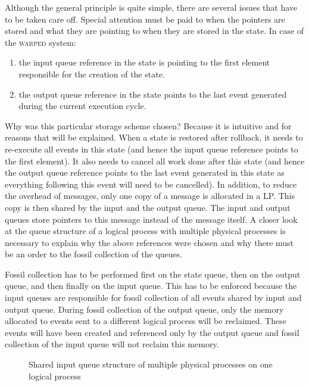 \documentclass[11pt]{report}
\begin{document}
Although the general principle is quite simple, there are several issues
that have to be taken care off. Special attention must be paid to when the
pointers are stored and what they are pointing to when they are stored in
the state. In case of the \textsc{warped} system:

\begin{enumerate}

\item the input queue reference in the state is pointing to the first element
responsible for the creation of the state.

\item the output queue reference in the state points to the last
event generated during the current execution cycle. 
\end{enumerate}

Why was this particular storage scheme chosen? Because it is intuitive and
for reasons that will be explained. When a state is restored after
rollback, it needs to re-execute all events in this state (and hence the
input queue reference points to the first element). It also needs to
cancel all work done after this state (and hence the output queue
reference points to the last event generated in this state as everything
following this event will need to be cancelled).  In addition, to reduce
the overhead of messages, only one copy of a message is allocated in a
LP. This copy is then shared by the input and the output queue. The input
and output queues store pointers to this message instead of the message
itself. A closer look at the queue structure of a logical process with
multiple physical processes is necessary to explain why the above
references were chosen and why there must be an order to the fossil
collection of the queues.

Fossil collection has to be performed first on the state queue, then on
the output queue, and then finally on the input queue.  This has to be
enforced because the input queues are responsible for fossil collection of
all events shared by input and output queue.  During fossil collection of
the output queue, only the memory allocated to events sent to a different
logical process will be reclaimed. These events will have been created and
referenced only by the output queue and fossil collection of the input
queue will not reclaim this memory.

\begin{figure}
\centerline{}
\caption{Shared input queue structure of multiple physical processes
  on one logical process\label{fig:twoProcesses}}
\end{figure}
\end{document}
